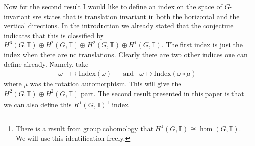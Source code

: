 \documentclass[12pt,a4paper,twoside]{article}
\newcommand{\TT}{\mathbb T}
\theoremstyle{definition}
\numberwithin{equation}{section}
\begin{document}
Now for the second result I would like to define an index on the space of $G$-invariant sre states that is translation invariant in both the horizontal and the vertical directions. In the introduction we already stated that the conjecture indicates that this is classified by $H^3(G,\TT)\oplus H^2(G,\TT)\oplus H^2(G,\TT)\oplus H^1(G,\TT)$. The first index is just the index when there are no translations. Clearly there are two other indices one can define already. Namely, take
\begin{align}
	\omega&\mapsto \textrm{Index}(\omega)&&\text{and}&\omega\mapsto \textrm{Index}(\omega\circ\mu)
\end{align}
where $\mu$ was the rotation automorphism. This will give the $H^2(G,\TT)\oplus H^2(G,\TT)$ part. The second result presented in this paper is that we can also define this $H^1(G,\TT)$\footnote{There is a result from group cohomology that $H^1(G,\TT)\cong\hom(G,\TT)$. We will use this identification freely.} index.
\end{document}
